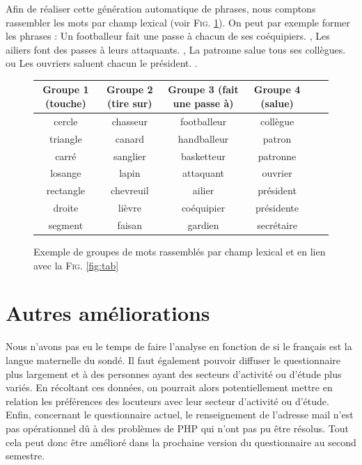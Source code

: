 \documentclass[11pt,letterpaper]{article}
\begin{document}
\vspace{-8px}

Afin de réaliser cette génération automatique de phrases, nous comptons rassembler les mots par champ lexical (voir \textsc{Fig. }\ref{fig:tab2}). On peut par exemple former les phrases : \og Un footballeur fait une passe à chacun de ses coéquipiers. \fg{}, \og Les ailiers font des passes à leurs attaquants. \fg{}, \og La patronne salue tous ses collègues. \fg{} ou \og Les ouvriers saluent chacun le président. \fg{}.

\vspace{8px}

\begin{figure}[htbp]
\begin{center}
\begin{tabular}{|c|c|c|c|c|c|}
    \hline
      \textbf{Groupe 1 (touche)} & \textbf{Groupe 2 (tire sur)} & \textbf{Groupe 3  (fait une passe à)} & \textbf{Groupe 4 (salue)}\\
      \hline
      cercle & chasseur & footballeur & collègue\\
      \hline
      triangle & canard & handballeur & patron\\
      \hline
      carré & sanglier & basketteur & patronne\\
      \hline
      losange & lapin & attaquant & ouvrier\\
      \hline
      rectangle & chevreuil & ailier & président\\
      \hline
      droite & lièvre & coéquipier & présidente\\
      \hline
      segment & faisan & gardien & secrétaire\\
      \hline
    \end{tabular}
\caption{Exemple de groupes de mots rassemblés par champ lexical et en lien avec la \textsc{Fig. }\ref{fig:tab}}
\label{fig:tab2}
\end{center}
\end{figure}

\vspace{-25px}

\section{Autres améliorations}

Nous n'avons pas eu le temps de faire l'analyse en fonction de si le français est la langue maternelle du sondé. Il faut également pouvoir diffuser le questionnaire plus largement et à des personnes ayant des secteurs d'activité ou d'étude plus variés. En récoltant ces données, on pourrait alors potentiellement mettre en relation les préférences des locuteurs avec leur secteur d'activité ou d'étude. Enfin, concernant le questionnaire actuel, le renseignement de l'adresse mail n'est pas opérationnel dû à des problèmes de PHP qui n'ont pas pu être résolus. Tout cela peut donc être amélioré dans la prochaine version du questionnaire au second semestre.
\end{document}
